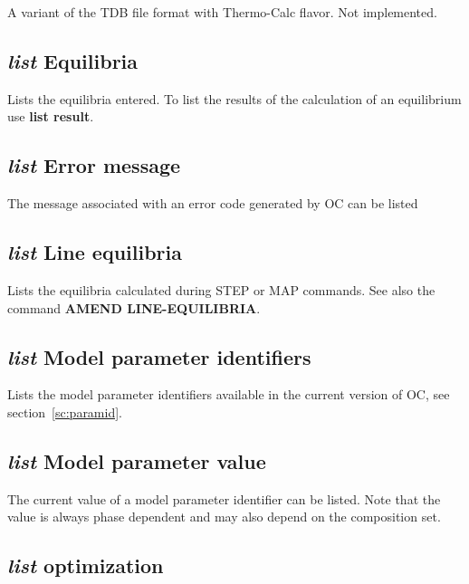 \documentclass[11pt]{article}
\begin{document}
A variant of the TDB file format with Thermo-Calc flavor.  Not implemented.

\hypertarget{list equilibria}{}
\subsection{{\em list} Equilibria}

Lists the equilibria entered.  To list the results of the calculation
of an equilibrium use {\bf list result}.

\hypertarget{List error msg}{}
\subsection{{\em list} Error message}

The message associated with an error code generated by OC can be listed

\hypertarget{List line-equilibria}{}
\subsection{{\em list} Line equilibria}

Lists the equilibria calculated during STEP or MAP commands.  See also
the command {\bf AMEND LINE-EQUILIBRIA}.


\hypertarget{List model parameter id}{}
\subsection{{\em list} Model parameter identifiers}

Lists the model parameter identifiers available in the current version
of OC, see section~\ref{sc:paramid}.

\hypertarget{List model parameter val}{}
\subsection{{\em list} Model parameter value}

The current value of a model parameter identifier can be listed.  Note
that the value is always phase dependent and may also depend on the
composition set.

\hypertarget{List Optimization}{}
\subsection{{\em list} optimization}
\end{document}
